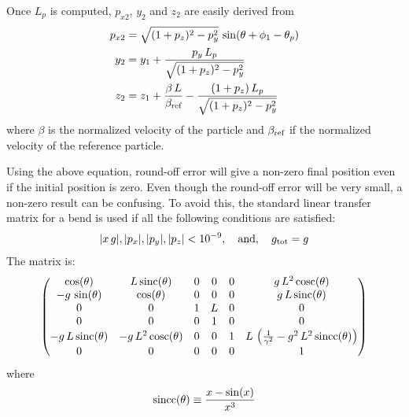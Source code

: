 Once $L_p$ is computed, $p_{x2}$, $y_2$ and $z_2$ are easily derived from
\begin{align}
  p_{x2} &= \sqrt{(1 + p_z)^2 - p_y^2} \, \sin(\theta + \phi_1 - \theta_p) \\
  y_2 &= y_1 + \frac{p_y \, L_p}{\sqrt{(1+p_z)^2 - p_y^2}} \\
  z_2 &= z_1 + \frac{\beta \, L}{\beta_{\text{ref}}} - \frac{(1 + p_z) \, L_p}{\sqrt{(1+p_z)^2 - p_y^2}}
\end{align}
where $\beta$ is the normalized velocity of the particle and $\beta_{\text{ref}}$ if the normalized
velocity of the reference particle.

Using the above equation, round-off error will give a non-zero final position even if the initial
position is zero. Even though the round-off error will be very small, a non-zero result can be
confusing. To avoid this, the standard linear transfer matrix for a bend is used if all the
following conditions are satisfied:
\begin{equation}
  |x \, g|, |p_x|, |p_y|, |p_z| <  10^{-9}, \quad \text{and}, \quad g_{\text{tot}} = g
\end{equation}
The matrix is:
\begin{equation}
  \begin{pmatrix}
    \cos(\theta)            & L \, \text{sinc}(\theta)  & 0 & 0 & 0 & g \, L^2 \, \text{cosc}(\theta) \\
   -g \, \sin(\theta)       & \cos(\theta)        & 0 & 0 & 0 & g \, L \, \text{sinc}(\theta)   \\
    0                       & 0                   & 1 & L & 0 & 0                         \\
    0                       & 0                   & 0 & 1 & 0 & 0                         \\
   -g \, L \, \text{sinc}(\theta) & 
                       -g \, L^2 \, \text{cosc}(\theta) & 0 & 0 & 1 & 
                   L \,  \left( \frac{1}{\gamma^2} - g^2 \, L^2 \, \text{sincc}(\theta) \right) \\
    0                       & 0                   & 0 & 0 & 0 & 1                       
  \end{pmatrix}
\end{equation}
where
\begin{equation}
  \text{sincc}(\theta) \equiv \frac{x - \sin(x)}{x^3}
\end{equation}

